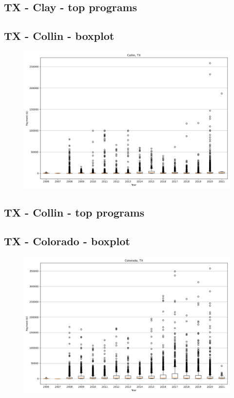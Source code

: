 \subsection*{TX - Clay - top programs}

\newpage
\subsection*{TX - Collin - boxplot}
\begin{figure}[h]
\centering
\includegraphics[width=7in]{../output/boxplots/counties/Collin-TX_boxplot.png}
\end{figure}


\subsection*{TX - Collin - top programs}

\newpage
\subsection*{TX - Colorado - boxplot}
\begin{figure}[h]
\centering
\includegraphics[width=7in]{../output/boxplots/counties/Colorado-TX_boxplot.png}
\end{figure}


